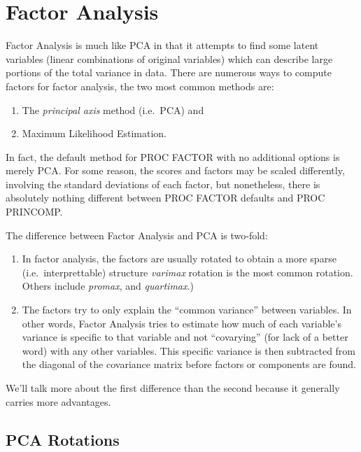 \documentclass[
]{article}
\providecommand{\tightlist}{%
  \setlength{\itemsep}{0pt}\setlength{\parskip}{0pt}}
\theoremstyle{definition}
\theoremstyle{definition}
\theoremstyle{definition}
\theoremstyle{definition}
\theoremstyle{remark}
\begin{document}
\hypertarget{fa-apps}{%
\section{Factor Analysis}\label{fa-apps}}

Factor Analysis is much like PCA in that it attempts to find some latent variables (linear combinations of original variables) which can describe large portions of the total variance in data. There are numerous ways to compute factors for factor analysis, the two most common methods are:

\begin{enumerate}
\def\labelenumi{\arabic{enumi}.}
\tightlist
\item
  The \emph{principal axis} method (i.e.~PCA) and
\item
  Maximum Likelihood Estimation.
\end{enumerate}

In fact, the default method for PROC FACTOR with no additional options is merely PCA. For some reason, the scores and factors may be scaled differently, involving the standard deviations of each factor, but nonetheless, there is absolutely nothing different between PROC FACTOR defaults and PROC PRINCOMP.

The difference between Factor Analysis and PCA is two-fold:

\begin{enumerate}
\def\labelenumi{\arabic{enumi}.}
\tightlist
\item
  In factor analysis, the factors are usually rotated to obtain a more sparse (i.e.~interprettable) structure \emph{varimax} rotation is the most common rotation. Others include \emph{promax}, and \emph{quartimax}.)
\item
  The factors try to only explain the ``common variance'' between variables. In other words, Factor Analysis tries to estimate how much of each variable's variance is specific to that variable and not ``covarying'' (for lack of a better word) with any other variables. This specific variance is then subtracted from the diagonal of the covariance matrix before factors or components are found.
\end{enumerate}

We'll talk more about the first difference than the second because it generally carries more advantages.

\hypertarget{pca-rotations}{%
\subsection{PCA Rotations}\label{pca-rotations}}
\end{document}

